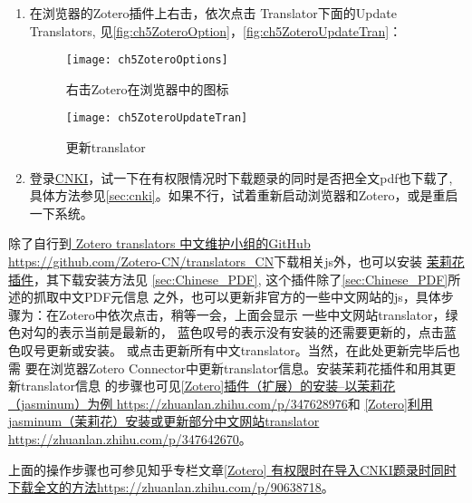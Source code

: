 \documentclass[cn,11pt,chinese]{elegantbook}
\begin{document}
\begin{enumerate}
				  \item
				  在浏览器的Zotero插件上右击，依次点击 Translator下面的Update Translators,
				  见\autoref{fig:ch5ZoteroOption}，\autoref{fig:ch5ZoteroUpdateTran}：
				  \begin{figure}[htbp]
				  	\centering
				  	\texttt{[image: ch5ZoteroOptions]}
				  	\caption{右击Zotero在浏览器中的图标}
				  	\label{fig:ch5ZoteroOption}
				  \end{figure}
			     \begin{figure}[htbp]
			  	  \centering
			  	  \texttt{[image: ch5ZoteroUpdateTran]}
			  	  \caption{更新translator}
			  	  \label{fig:ch5ZoteroUpdateTran}
			     \end{figure}
		  \item
		  登录\href{http://www.cnki.net}{CNKI}，试一下在有权限情况时下载题录的同时是否把全文pdf也下载了,
		  具体方法参见\cref{sec:cnki}。如果不行，试着重新启动浏览器和Zotero，或是重启一下系统。
		   \end{enumerate}
	   
		除了自行到\href{https://github.com/Zotero-CN/translators_CN}{ Zotero translators 
		中文维护小组的GitHub 
		\url{ https://github.com/Zotero-CN/translators_CN}}下载相关js外，也可以安装
		\href{https://github.com/l0o0/jasminum/releases}{茉莉花插件}，其下载安装方法见
		\cref{sec:Chinese_PDF}, 这个插件除了\cref{sec:Chinese_PDF}所述的抓取中文PDF元信息
		之外，也可以更新非官方的一些中文网站的js，具体步骤为：在Zotero中依次点击，稍等一会，上面会显示
		一些中文网站translator，绿色对勾的表示当前是最新的，
		蓝色叹号的表示没有安装的还需要更新的，点击蓝色叹号更新或安装。
		或点击更新所有中文translator。当然，在此处更新完毕后也需
		要在浏览器Zotero Connector中更新translator信息。安装茉莉花插件和用其更新translator信息
		的步骤也可见\href{https://zhuanlan.zhihu.com/p/347628976}
		{[Zotero]插件（扩展）的安装--以茉莉花（jasminum）为例
		\url{https://zhuanlan.zhihu.com/p/347628976}}和
		\href{https://zhuanlan.zhihu.com/p/347642670}
		{[Zotero]利用jasminum（茉莉花）安装或更新部分中文网站translator
		\url{https://zhuanlan.zhihu.com/p/347642670}}。


	   上面的操作步骤也可参见知乎专栏文章\href{https://zhuanlan.zhihu.com/p/90638718}{[Zotero]
	   有权限时在导入CNKI题录时同时下载全文的方法\url{https://zhuanlan.zhihu.com/p/90638718}}。
	
\end{document}
